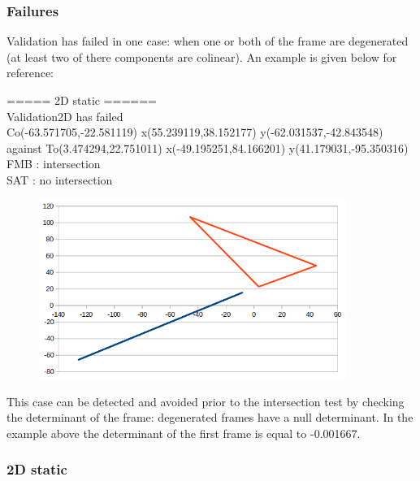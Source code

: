 \documentclass[12pt, a4paper]{article}
\begin{document}
\subsubsection{Failures}

Validation has failed in one case: when one or both of the frame are degenerated (at least two of there components are colinear). An example is given below for reference:\\

\begin{scriptsize}
\begin{ttfamily}
===== 2D static ======\\
Validation2D has failed\\
Co(-63.571705,-22.581119) x(55.239119,38.152177) y(-62.031537,-42.843548) against To(3.474294,22.751011) x(-49.195251,84.166201) y(41.179031,-95.350316)\\
FMB : intersection\\
SAT : no intersection\\
\end{ttfamily}
\end{scriptsize}

\begin{center}
\begin{figure}[H]
\centering\includegraphics[width=10cm]{./degeneratedFrame.png}\\
\end{figure}
\end{center}

This case can be detected and avoided prior to the intersection test by checking the determinant of the frame: degenerated frames have a null determinant. In the example above the determinant of the first frame is equal to -0.001667.

\subsubsection{2D static}
\end{document}

